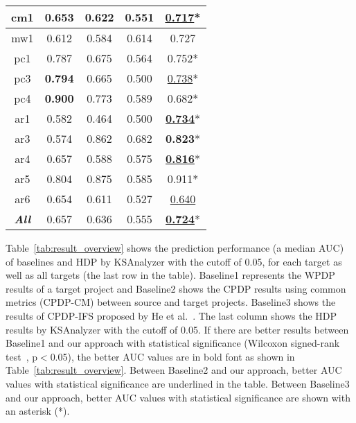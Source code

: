 \begin{table}[!t]
\begin{tabular}{|@{ }c@{ }||c|c|c||@{ }c@{ }|}
cm1			&0.653	& 0.622 &0.551	&{\bf \underline{0.717}}*	 \\ \hline
mw1			&0.612	& 0.584 &0.614	& 0.727		\\ \hline
pc1			&0.787	& 0.675 &0.564	&0.752*		\\ \hline
pc3			&{\bf 0.794}	& 0.665 &0.500	&\underline{0.738}*		\\ \hline
pc4			&{\bf 0.900}	& 0.773 &0.589	&0.682*	 \\ \hline \hline

ar1		&0.582	& 0.464  &0.500	&{\bf \underline{0.734}}*		\\ \hline
ar3		&0.574	& 0.862 &0.682	&{\bf 0.823}*	 	\\ \hline
ar4		&0.657	& 0.588 &0.575	&{\bf \underline{0.816}}*	 \\ \hline
ar5		&0.804	& 0.875	&0.585	&0.911*	\\ \hline
ar6		&0.654	& 0.611 &0.527	&\underline{0.640}		\\ \hline \hline \hline

{\bf {\em All}} & 0.657 & 0.636 &0.555	& \underline{\bf 0.724}*  \\ \hline


\end{tabular}
\end{table}

% 


Table~\ref{tab:result_overview} shows the prediction performance (a median AUC)
of baselines and HDP by KSAnalyzer with the cutoff of 0.05,
for each target as well as all targets (the last row in the table). Baseline1 represents
the WPDP results of a target project and Baseline2 shows
the CPDP results using common metrics (CPDP-CM) between source and target
projects. Baseline3 shows the results of CPDP-IFS proposed by He et
al.~\cite{He14}. The last column shows the HDP results by KSAnalyzer with the
cutoff of 0.05. If there are better results between Baseline1 and our approach with statistical significance (Wilcoxon signed-rank
test~\cite{Wilcoxon45}, p$<$0.05), the better AUC values are in
bold font as shown in Table~\ref{tab:result_overview}.
Between Baseline2 and our approach, better AUC values with
statistical significance are underlined in
the table. Between Baseline3 and our approach, better AUC values with
statistical significance are shown with an asterisk (*).

